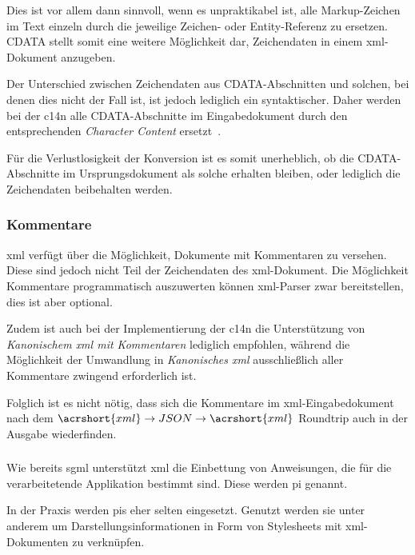 Dies ist vor allem dann sinnvoll, wenn es unpraktikabel ist, alle Markup-Zeichen im Text einzeln durch die jeweilige Zeichen- oder Entity-Referenz zu ersetzen. CDATA stellt somit eine weitere Möglichkeit dar, Zeichendaten in einem \acrshort{xml}-Dokument anzugeben.~\cite[Abschnitt~2.4]{maler2008xml}

Der Unterschied zwischen Zeichendaten aus CDATA-Abschnitten und solchen, bei denen dies nicht der Fall ist, ist jedoch lediglich ein syntaktischer. Daher werden bei der \acrlong{c14n} alle CDATA-Abschnitte im Eingabedokument durch den entsprechenden \emph{Character Content} ersetzt~\cite[Abschnitt~2.1]{boyer2001c14n}.

Für die Verlustlosigkeit der Konversion ist es somit unerheblich, ob die CDATA-Abschnitte im Ursprungsdokument als solche erhalten bleiben, oder lediglich die Zeichendaten beibehalten werden.

\subsubsection{Kommentare}

\acrshort{xml} verfügt über die Möglichkeit, Dokumente mit Kommentaren zu versehen. Diese sind jedoch nicht Teil der Zeichendaten des \acrshort{xml}-Dokument. Die Möglichkeit Kommentare programmatisch auszuwerten können  \acrshort{xml}-Parser zwar bereitstellen, dies ist aber optional.

Zudem ist auch bei der Implementierung der \acrlong{c14n} die Unterstützung von \emph{Kanonischem \acrshort{xml} mit Kommentaren} lediglich empfohlen, während die Möglichkeit der Umwandlung in \emph{Kanonisches \acrshort{xml}} ausschließlich aller Kommentare zwingend erforderlich ist.~\cite[Abschnitt~2.1]{boyer2001c14n}

Folglich ist es nicht nötig, dass sich die Kommentare im \acrshort{xml}-Eingabedokument nach dem $\acrshort{xml}\rightarrow{}JSON\rightarrow{}\acrshort{xml}$ Roundtrip auch in der Ausgabe wiederfinden.

\subsubsection{}

Wie bereits \acrshort{sgml} unterstützt \acrshort{xml} die Einbettung von Anweisungen, die für die verarbeitetende Applikation bestimmt sind. Diese werden \acrfull{pi} genannt.

In der Praxis werden \glspl{pi} eher selten eingesetzt. Genutzt werden sie unter anderem um Darstellungsinformationen in Form von Stylesheets mit \acrshort{xml}-Dokumenten zu verknüpfen.~\cite[Abschnitt 4]{xmlstylesheet}

